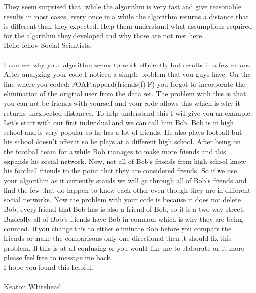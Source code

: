 \documentclass[12pt]{article}
\begin{document}
\pagebreak
They seem surprised that, while the algorithm is very fast and give reasonable
results in most cases, every once in a while the algorithm returns a distance
that is different than they expected. Help them understand what assumptions
required for the algorithm they developed and why those are not met here.\\

Hello fellow Social Scientists,\\
\\
I can see why your algorithm seems to work efficiently but results in a few errors. After analyzing your code I noticed a simple problem that you guys have. On the line where you coded: FOAF.append(friends(f)-F) you forgot to incorporate the elimination of the original user from the data set. The problem with this is that you can not be friends with yourself and your code allows this which is why it returns unexpected distances. To help understand this I will give you an example. Let's start with our first individual and we can call him Bob. Bob is in high school and is very popular so he has a lot of friends. He also plays football but his school doesn't offer it so he plays at a different high school. After being on the football team for a while Bob manages to make more friends and this expands his social network. Now, not all of Bob's friends from high school know his football friends to the point that they are considered friends. So if we use your algorithm as it currently stands we will go through all of Bob's friends and find the few that do happen to know each other even though they are in different social networks. Now the problem with your code is because it does not delete Bob, every friend that Bob has is also a friend of Bob, so it is a two-way street. Basically all of Bob's friends have Bob in common which is why they are being counted. If you change this to either eliminate Bob before you compare the friends or make the comparisons only one directional then it should fix this problem. If this is at all confusing or you would like me to elaborate on it more please feel free to message me back. \\
I hope you found this helpful,\\
\\
Keaton Whitehead

\pagebreak
\end{document}
